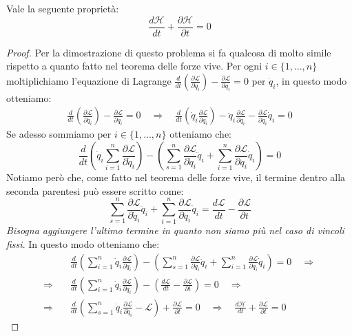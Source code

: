 \documentclass[11pt,a4paper,twoside]{article}
\theoremstyle{definition}
\begin{document}
\begin{thm}{}{}
	Vale la seguente proprietà:
	\[ \frac{d\mathcal H}{dt} + \frac{\partial \mathcal H}{\partial t}=0 \]
\end{thm}
\begin{proof}
	Per la dimostrazione di questo problema si fa qualcosa di molto simile rispetto a quanto fatto nel teorema delle forze vive. Per ogni $i \in \{1,...,n\}$ moltiplichiamo l'equazione di Lagrange $\frac d{dt}\left(\frac{\partial \mathcal L}{\partial \dot q_i}\right) - \frac{\partial \mathcal L}{\partial q_i} =0$ per $\dot q_i$, in questo modo otteniamo:
	\begin{align*}
		\frac d{dt}\left(\frac{\partial \mathcal L}{\partial \dot q_i}\right) - \frac{\partial \mathcal L}{\partial q_i} =0 \quad \Rightarrow \quad \frac d{dt}\left(\dot q_i \frac{\partial \mathcal L}{\partial \dot q_i}\right) - \ddot q_i \frac{\partial \mathcal L}{\partial \dot q_i} - \frac{\partial \mathcal L}{\partial q_i}\dot q_i =0
	\end{align*}
	Se adesso sommiamo per $i \in \{1,...,n\}$ otteniamo che:
	\[ \frac d{dt} \left(\dot q_i \sum_{i=1}^n \frac{\partial \mathcal L}{\partial \dot q_i} \right) - \left( \sum_{s=1}^n \frac{\partial \mathcal L}{\partial \dot q_i} \ddot q_i + \sum_{i=1}^n \frac{\partial \mathcal L}{\partial q_i}\dot q_i \right) =0 \]
	Notiamo però che, come fatto nel teorema delle forze vive, il termine dentro alla seconda parentesi può essere scritto come:
	\[ \sum_{s=1}^n \frac{\partial \mathcal L}{\partial \dot q_i} \ddot q_i + \sum_{i=1}^n \frac{\partial \mathcal L}{\partial q_i}\dot q_i = \frac{d \mathcal L}{d t} - \frac{\partial \mathcal L}{\partial t} \]
	\textit{Bisogna aggiungere l'ultimo termine in quanto non siamo più nel caso di vincoli fissi}. In questo modo otteniamo che:
	\begin{align*}
		& \frac d{dt} \left(\sum_{i=1}^n \dot q_i \frac{\partial \mathcal L}{\partial \dot q_i} \right) - \left( \sum_{s=1}^n \frac{\partial \mathcal L}{\partial \dot q_i} \ddot q_i + \sum_{i=1}^n \frac{\partial \mathcal L}{\partial q_i}\dot q_i \right) =0 \quad \Rightarrow\\
		\Rightarrow \quad & \frac d{dt} \left( \sum_{i=1}^n \dot q_i \frac{\partial \mathcal L}{\partial \dot q_i} \right) - \left( \frac{d \mathcal L}{d t} - \frac{\partial \mathcal L}{\partial t} \right) =0 \quad \Rightarrow\\
		\Rightarrow \quad & \frac{d}{dt}\left( \sum_{s=1}^n \dot q_i \frac{\partial \mathcal L}{\partial \dot q_i} - \mathcal L\right) + \frac{\partial \mathcal L}{\partial t} = 0 \quad \Rightarrow \quad \frac{d \mathcal H}{dt} + \frac{\partial \mathcal L}{\partial t} = 0
	\end{align*}
\end{proof}
\end{document}
